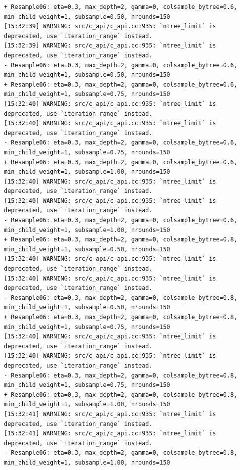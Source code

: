 \documentclass[
  letterpaper,
  DIV=11,
  numbers=noendperiod]{scrartcl}
\begin{document}
\begin{verbatim}
+ Resample06: eta=0.3, max_depth=2, gamma=0, colsample_bytree=0.6, min_child_weight=1, subsample=0.50, nrounds=150 
[15:32:39] WARNING: src/c_api/c_api.cc:935: `ntree_limit` is deprecated, use `iteration_range` instead.
[15:32:39] WARNING: src/c_api/c_api.cc:935: `ntree_limit` is deprecated, use `iteration_range` instead.
- Resample06: eta=0.3, max_depth=2, gamma=0, colsample_bytree=0.6, min_child_weight=1, subsample=0.50, nrounds=150 
+ Resample06: eta=0.3, max_depth=2, gamma=0, colsample_bytree=0.6, min_child_weight=1, subsample=0.75, nrounds=150 
[15:32:40] WARNING: src/c_api/c_api.cc:935: `ntree_limit` is deprecated, use `iteration_range` instead.
[15:32:40] WARNING: src/c_api/c_api.cc:935: `ntree_limit` is deprecated, use `iteration_range` instead.
- Resample06: eta=0.3, max_depth=2, gamma=0, colsample_bytree=0.6, min_child_weight=1, subsample=0.75, nrounds=150 
+ Resample06: eta=0.3, max_depth=2, gamma=0, colsample_bytree=0.6, min_child_weight=1, subsample=1.00, nrounds=150 
[15:32:40] WARNING: src/c_api/c_api.cc:935: `ntree_limit` is deprecated, use `iteration_range` instead.
[15:32:40] WARNING: src/c_api/c_api.cc:935: `ntree_limit` is deprecated, use `iteration_range` instead.
- Resample06: eta=0.3, max_depth=2, gamma=0, colsample_bytree=0.6, min_child_weight=1, subsample=1.00, nrounds=150 
+ Resample06: eta=0.3, max_depth=2, gamma=0, colsample_bytree=0.8, min_child_weight=1, subsample=0.50, nrounds=150 
[15:32:40] WARNING: src/c_api/c_api.cc:935: `ntree_limit` is deprecated, use `iteration_range` instead.
[15:32:40] WARNING: src/c_api/c_api.cc:935: `ntree_limit` is deprecated, use `iteration_range` instead.
- Resample06: eta=0.3, max_depth=2, gamma=0, colsample_bytree=0.8, min_child_weight=1, subsample=0.50, nrounds=150 
+ Resample06: eta=0.3, max_depth=2, gamma=0, colsample_bytree=0.8, min_child_weight=1, subsample=0.75, nrounds=150 
[15:32:40] WARNING: src/c_api/c_api.cc:935: `ntree_limit` is deprecated, use `iteration_range` instead.
[15:32:40] WARNING: src/c_api/c_api.cc:935: `ntree_limit` is deprecated, use `iteration_range` instead.
- Resample06: eta=0.3, max_depth=2, gamma=0, colsample_bytree=0.8, min_child_weight=1, subsample=0.75, nrounds=150 
+ Resample06: eta=0.3, max_depth=2, gamma=0, colsample_bytree=0.8, min_child_weight=1, subsample=1.00, nrounds=150 
[15:32:41] WARNING: src/c_api/c_api.cc:935: `ntree_limit` is deprecated, use `iteration_range` instead.
[15:32:41] WARNING: src/c_api/c_api.cc:935: `ntree_limit` is deprecated, use `iteration_range` instead.
- Resample06: eta=0.3, max_depth=2, gamma=0, colsample_bytree=0.8, min_child_weight=1, subsample=1.00, nrounds=150 

\end{verbatim}
\end{document}

